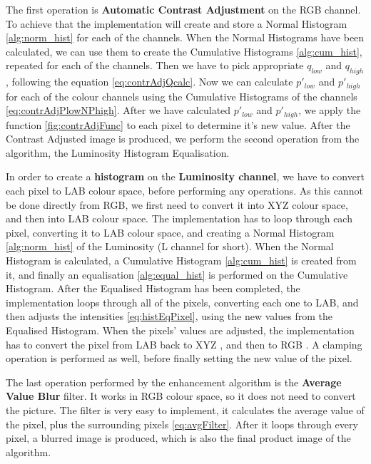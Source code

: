 \documentclass[journal,transmag]{IEEEtran}
\begin{document}
The first operation is \textbf{Automatic Contrast Adjustment} on the RGB channel. To achieve that the implementation will create and store a Normal Histogram \ref{alg:norm_hist} for each of the channels. When the Normal Histograms have been calculated, we can use them to create the Cumulative Histograms \ref{alg:cum_hist}, repeated for each of the channels. Then we have to pick appropriate $q_{low}$ and $q_{high}$, following the equation \ref{eq:contrAdjQcalc}. Now we can calculate $p'_{low}$ and $p'_{high}$ for each of the colour channels using the Cumulative Histograms of the channels \ref{eq:contrAdjPlowNPhigh}. After we have calculated $p'_{low}$ and $p'_{high}$, we apply the function \ref{fig:contrAdjFunc} to each pixel to determine it's new value. After the Contrast Adjusted image is produced, we perform the second operation from the algorithm, the Luminosity Histogram Equalisation.

In order to create a \textbf{histogram} on the \textbf{Luminosity channel}, we have to convert each pixel to LAB colour space, before performing any operations. As this cannot be done directly from RGB, we first need to convert it into XYZ \cite{rgbTOxyz} colour space, and then into LAB \cite{xyzTOlab} colour space. The implementation has to loop through each pixel, converting it to LAB colour space, and creating a Normal Histogram \ref{alg:norm_hist} of the Luminosity (L channel for short). When the Normal Histogram is calculated, a Cumulative Histogram \ref{alg:cum_hist} is created from it, and finally an equalisation \ref{alg:equal_hist} is performed on the Cumulative Histogram. After the Equalised Histogram has been completed, the implementation loops through all of the pixels, converting each one to LAB, and then adjusts the intensities \ref{eq:histEqPixel}, using the new values from the Equalised Histogram. When the pixels' values are adjusted, the implementation has to convert the pixel from LAB back to XYZ \cite{labTOxyz}, and then to RGB \cite{xyzTOrgb}. A clamping operation is performed as well, before finally setting the new value of the pixel.

The last operation performed by the enhancement algorithm is the \textbf{Average Value Blur} filter. It works in RGB colour space, so it does not need to convert the picture. The filter is very easy to implement, it calculates the average value of the pixel, plus the surrounding pixels \ref{eq:avgFilter}. After it loops through every pixel, a blurred image is produced, which is also the final product image of the algorithm.
\end{document}
